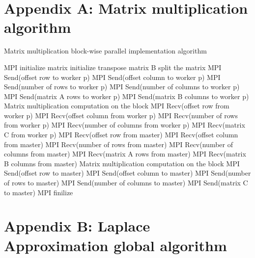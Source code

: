 \documentclass[]{article}
\begin{document}
\begin{appendices}
	\section*{Appendix A: Matrix multiplication algorithm}
	
	\begin{algorithm}
		\caption{Matrix multiplication block-wise parallel implementation algorithm}
		\label{matmul}
		\begin{algorithmic}
			\STATE MPI initialize
				\STATE matrix initialize
				\STATE transpose matrix B
				\STATE split the matrix 
				\STATE MPI Send(offset row to worker p)
				\STATE MPI Send(offset column to worker p)
				\STATE MPI Send(number of rows to worker p)
				\STATE MPI Send(number of columns to worker p)
				\STATE MPI Send(matrix A rows to worker p)
				\STATE MPI Send(matrix B columns to worker p)
			\ENDFOR
			\STATE Matrix multiplication computation on the block
				\STATE MPI Recv(offset row from worker p)
				\STATE MPI Recv(offset column from worker p)
				\STATE MPI Recv(number of rows from worker p)
				\STATE MPI Recv(number of columns from worker p)
				\STATE MPI Recv(matrix C from worker p)
			\ENDFOR
			\ELSE 
				\STATE MPI Recv(offset row from master)
				\STATE MPI Recv(offset column from master)
				\STATE MPI Recv(number of rows from master)
				\STATE MPI Recv(number of columns from master)
				\STATE MPI Recv(matrix A rows from master)
				\STATE MPI Recv(matrix B columns from master)
				\STATE
				\STATE Matrix multiplication computation on the block
				\STATE
				\STATE MPI Send(offset row to master)
				\STATE MPI Send(offset column to master)
				\STATE MPI Send(number of rows to master)
				\STATE MPI Send(number of columns to master)
				\STATE MPI Send(matrix C to master)
			\ENDIF
			\STATE MPI finilize
		\end{algorithmic}
	\end{algorithm}
	
	\newpage
	
	\section*{Appendix B: Laplace Approximation global algorithm}
	

\end{appendices}
\end{document}
